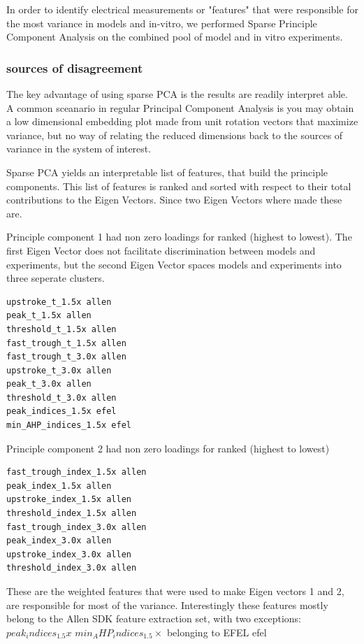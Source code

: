 In order to identify electrical measurements or "features" that were responsible for the most variance in models and in-vitro, we performed Sparse Principle Component Analysis \cite{zou2006sparse} on the combined pool of model and in vitro experiments. 



\subsubsection{sources of disagreement}

The key advantage of using sparse PCA is the results are readily interpret able. A common sceanario in regular Principal Component Analysis is you may obtain a low dimensional embedding plot made from unit rotation vectors that maximize variance, but no way of relating the reduced dimensions back to the sources of variance in the system of interest. 

Sparse PCA yields an interpretable list of features, that build the principle components. This list of features is ranked and sorted with respect to their total contributions to the Eigen Vectors. Since two Eigen Vectors where made these are.

Principle component 1 had non zero loadings for ranked (highest to lowest).
The first Eigen Vector does not facilitate discrimination between models and experiments, but the second Eigen Vector spaces models and experiments into three seperate clusters.
\begin{verbatim}
upstroke_t_1.5x allen 
peak_t_1.5x allen 
threshold_t_1.5x allen 
fast_trough_t_1.5x allen 
fast_trough_t_3.0x allen 
upstroke_t_3.0x allen 
peak_t_3.0x allen 
threshold_t_3.0x allen 
peak_indices_1.5x efel 
min_AHP_indices_1.5x efel 
\end{verbatim}

Principle component 2 had non zero loadings for ranked (highest to lowest)
\begin{verbatim}
fast_trough_index_1.5x allen 
peak_index_1.5x allen 
upstroke_index_1.5x allen 
threshold_index_1.5x allen 
fast_trough_index_3.0x allen 
peak_index_3.0x allen 
upstroke_index_3.0x allen 
threshold_index_3.0x allen
\end{verbatim}

These are the weighted features that were used to make Eigen vectors 1 and 2, are responsible for most of the variance. Interestingly these features mostly belong to the Allen SDK feature extraction set, with two exceptions: $peak_indices_1.5x$ $min_AHP_indices_1.5 \times$ belonging to EFEL efel 

